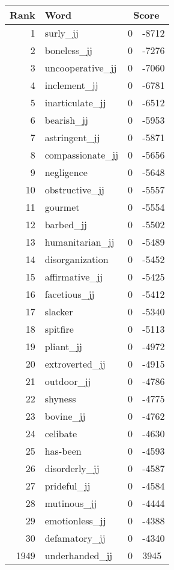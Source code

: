 \begin{longtable}[!htbp]{| rlr@{.}l |}
    \hline
    \textbf{Rank} & \textbf{Word} & \multicolumn{2}{c|}{\textbf{Score}} \\
    \hline
    \endhead
    1 & surly\_jj & 0 & -8712 \\
    2 & boneless\_jj & 0 & -7276 \\
    3 & uncooperative\_jj & 0 & -7060 \\
    4 & inclement\_jj & 0 & -6781 \\
    5 & inarticulate\_jj & 0 & -6512 \\
    6 & bearish\_jj & 0 & -5953 \\
    7 & astringent\_jj & 0 & -5871 \\
    8 & compassionate\_jj & 0 & -5656 \\
    9 & negligence & 0 & -5648 \\
    10 & obstructive\_jj & 0 & -5557 \\
    11 & gourmet & 0 & -5554 \\
    12 & barbed\_jj & 0 & -5502 \\
    13 & humanitarian\_jj & 0 & -5489 \\
    14 & disorganization & 0 & -5452 \\
    15 & affirmative\_jj & 0 & -5425 \\
    16 & facetious\_jj & 0 & -5412 \\
    17 & slacker & 0 & -5340 \\
    18 & spitfire & 0 & -5113 \\
    19 & pliant\_jj & 0 & -4972 \\
    20 & extroverted\_jj & 0 & -4915 \\
    21 & outdoor\_jj & 0 & -4786 \\
    22 & shyness & 0 & -4775 \\
    23 & bovine\_jj & 0 & -4762 \\
    24 & celibate & 0 & -4630 \\
    25 & has-been & 0 & -4593 \\
    26 & disorderly\_jj & 0 & -4587 \\
    27 & prideful\_jj & 0 & -4584 \\
    28 & mutinous\_jj & 0 & -4444 \\
    29 & emotionless\_jj & 0 & -4388 \\
    30 & defamatory\_jj & 0 & -4340 \\
    1949 & underhanded\_jj & 0 & 3945 \\

\end{longtable}
